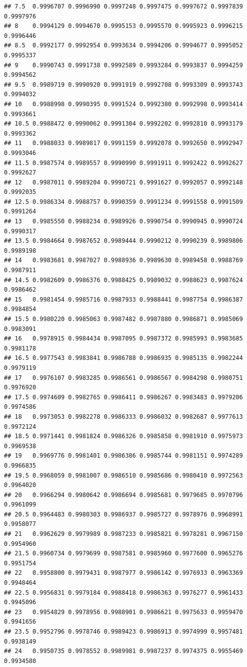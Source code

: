 \documentclass[
]{book}
\begin{document}
\begin{verbatim}
## 7.5  0.9996707 0.9996990 0.9997248 0.9997475 0.9997672 0.9997839 0.9997976
## 8    0.9994129 0.9994670 0.9995153 0.9995570 0.9995923 0.9996215 0.9996446
## 8.5  0.9992177 0.9992954 0.9993634 0.9994206 0.9994677 0.9995052 0.9995337
## 9    0.9990743 0.9991738 0.9992589 0.9993284 0.9993837 0.9994259 0.9994562
## 9.5  0.9989719 0.9990920 0.9991919 0.9992708 0.9993309 0.9993743 0.9994032
## 10   0.9988998 0.9990395 0.9991524 0.9992380 0.9992998 0.9993414 0.9993661
## 10.5 0.9988472 0.9990062 0.9991304 0.9992202 0.9992810 0.9993179 0.9993362
## 11   0.9988033 0.9989817 0.9991159 0.9992078 0.9992650 0.9992947 0.9993046
## 11.5 0.9987574 0.9989557 0.9990990 0.9991911 0.9992422 0.9992627 0.9992627
## 12   0.9987011 0.9989204 0.9990721 0.9991627 0.9992057 0.9992148 0.9992035
## 12.5 0.9986334 0.9988757 0.9990359 0.9991234 0.9991558 0.9991509 0.9991264
## 13   0.9985550 0.9988234 0.9989926 0.9990754 0.9990945 0.9990724 0.9990317
## 13.5 0.9984664 0.9987652 0.9989444 0.9990212 0.9990239 0.9989806 0.9989198
## 14   0.9983681 0.9987027 0.9988936 0.9989630 0.9989458 0.9988769 0.9987911
## 14.5 0.9982609 0.9986376 0.9988425 0.9989032 0.9988623 0.9987624 0.9986462
## 15   0.9981454 0.9985716 0.9987933 0.9988441 0.9987754 0.9986387 0.9984854
## 15.5 0.9980220 0.9985063 0.9987482 0.9987880 0.9986871 0.9985069 0.9983091
## 16   0.9978915 0.9984434 0.9987095 0.9987372 0.9985993 0.9983685 0.9981178
## 16.5 0.9977543 0.9983841 0.9986788 0.9986935 0.9985135 0.9982244 0.9979119
## 17   0.9976107 0.9983285 0.9986561 0.9986567 0.9984298 0.9980751 0.9976920
## 17.5 0.9974609 0.9982765 0.9986411 0.9986267 0.9983483 0.9979206 0.9974586
## 18   0.9973053 0.9982278 0.9986333 0.9986032 0.9982687 0.9977613 0.9972124
## 18.5 0.9971441 0.9981824 0.9986326 0.9985858 0.9981910 0.9975973 0.9969538
## 19   0.9969776 0.9981401 0.9986386 0.9985744 0.9981151 0.9974289 0.9966835
## 19.5 0.9968059 0.9981007 0.9986510 0.9985686 0.9980410 0.9972563 0.9964020
## 20   0.9966294 0.9980642 0.9986694 0.9985681 0.9979685 0.9970796 0.9961099
## 20.5 0.9964483 0.9980303 0.9986937 0.9985727 0.9978976 0.9968991 0.9958077
## 21   0.9962629 0.9979989 0.9987233 0.9985821 0.9978281 0.9967150 0.9954960
## 21.5 0.9960734 0.9979699 0.9987581 0.9985960 0.9977600 0.9965276 0.9951754
## 22   0.9958800 0.9979431 0.9987977 0.9986142 0.9976933 0.9963369 0.9948464
## 22.5 0.9956831 0.9979184 0.9988418 0.9986363 0.9976277 0.9961433 0.9945096
## 23   0.9954829 0.9978956 0.9988901 0.9986621 0.9975633 0.9959470 0.9941656
## 23.5 0.9952796 0.9978746 0.9989423 0.9986913 0.9974999 0.9957481 0.9938149
## 24   0.9950735 0.9978552 0.9989981 0.9987237 0.9974375 0.9955469 0.9934580

\end{verbatim}
\end{document}

